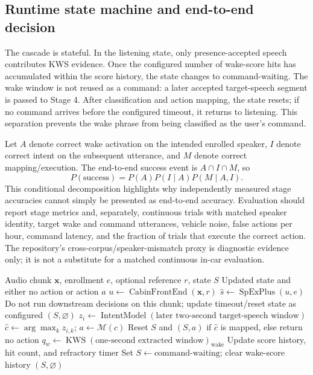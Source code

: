 \subsection{Runtime state machine and end-to-end decision}
\label{subsec:method-runtime}

The cascade is stateful. In the listening state, only presence-accepted speech contributes KWS evidence. Once the configured number of wake-score hits has accumulated within the score history, the state changes to command-waiting. The wake window is not reused as a command: a later accepted target-speech segment is passed to Stage 4. After classification and action mapping, the state resets; if no command arrives before the configured timeout, it returns to listening. This separation prevents the wake phrase from being classified as the user's command.

Let $A$ denote correct wake activation on the intended enrolled speaker, $I$ denote correct intent on the subsequent utterance, and $M$ denote correct mapping/execution. The end-to-end success event is $A\cap I\cap M$, so
\begin{equation}
  P(\mathrm{success})=P(A)P(I\mid A)P(M\mid A,I).
  \label{eq:method-e2e}
\end{equation}
This conditional decomposition highlights why independently measured stage accuracies cannot simply be presented as end-to-end accuracy. Evaluation should report stage metrics and, separately, continuous trials with matched speaker identity, target wake and command utterances, vehicle noise, false actions per hour, command latency, and the fraction of trials that execute the correct action. The repository's cross-corpus/speaker-mismatch proxy is diagnostic evidence only; it is not a substitute for a matched continuous in-car evaluation.

\begin{algorithm}[H]
  \caption{Implemented inference protocol from cabin audio to command action}
  \label{alg:method-inference}
  \begin{algorithmic}[1]
    \Require Audio chunk $\mathbf{x}$, enrollment $e$, optional reference $r$, state $S$
    \Ensure Updated state and either no action or action $a$
    \State $u\gets\operatorname{CabinFrontEnd}(\mathbf{x},r)$
    \State $\hat{s}\gets\operatorname{SpExPlus}(u,e)$
      \State Do not run downstream decisions on this chunk; update timeout/reset state as configured
      \State \Return $(S,\varnothing)$
    \EndIf
      \State $z_i\gets\operatorname{IntentModel}(\text{later two-second target-speech window})$
      \State $\hat{c}\gets\arg\max_k z_{i,k}$; $a\gets\mathcal{M}(\hat{c})$
      \State Reset $S$ and \Return $(S,a)$ if $\hat{c}$ is mapped, else return no action
    \EndIf
    \State $q_w\gets\operatorname{KWS}(\text{one-second extracted window})_{\mathrm{wake}}$
    \State Update score history, hit count, and refractory timer
      \State Set $S\gets\text{command-waiting}$; clear wake-score history
    \EndIf
    \State \Return $(S,\varnothing)$
  \end{algorithmic}
\end{algorithm}
